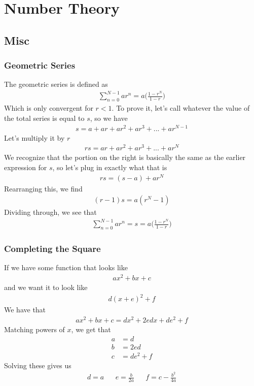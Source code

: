 \chapter{Number Theory}

\section{Misc}

\subsection{Geometric Series}
The geometric series is defined as 
\begin{align}
	\sum_{n=0}^{N-1} ar^n =a\Big( \frac{1-r^{N}}{1-r}\Big)
\end{align}
Which is only convergent for $r < 1$. To prove it, let's call whatever the value of the total series is equal to $s$, so we have
\begin{align}
	s = a + ar + ar^2 + ar^3 + ... + ar^{N-1}
\end{align}
Let's multiply it by $r$
\begin{align}
	rs =  ar + ar^2 + ar^3 + ... + ar^{N}
\end{align}
We recognize that the portion on the right is basically the same as the earlier expression for $s$, so let's plug in exactly what that is
\begin{align}
	rs = (s - a) + ar^N
\end{align}
Rearranging this, we find
\begin{align}
	(r-1)s = a(r^N - 1)
\end{align}
Dividing through, we see that
\begin{align}
	\sum_{n=0}^{N-1} ar^n = s = a\Big( \frac{1-r^{N}}{1-r}\Big)
\end{align}


\subsection{Completing the Square}
If we have some function that looks like
\begin{align}
ax^2 + bx + c
\end{align}
and we want it to look like
\begin{align}
d(x+e)^2 + f
\end{align}
We have that 
\begin{align}
ax^2 + bx + c = dx^2 + 2ed x + de^2 + f
\end{align}
Matching powers of $x$, we get that
\begin{align}
a &= d\\
b &= 2ed\\
c &= de^2+f
\end{align}
Solving these gives us
\begin{align}
d = a && e =\frac{b}{2a}  && f = c-\frac{b^2}{4a}
\end{align}




